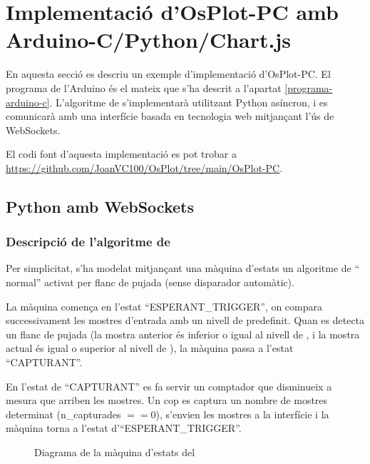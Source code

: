 \documentclass{tfgitic}[2023/07/07]
\begin{document}
\chapter{Implementació d'OsPlot-PC amb Arduino-C/Python/Chart.js}

En aquesta secció es descriu un exemple d'implementació
d'OsPlot-PC. El programa de l'Arduino és el mateix que s'ha descrit a
l'apartat \ref{programa-arduino-c}. L'algoritme de 
s'implementarà utilitzant Python asíncron, i es comunicarà amb una
interfície basada en tecnologia web mitjançant l'ús de WebSockets.

El codi font d'aquesta implementació es pot trobar a
\url{https://github.com/JoanVC100/OsPlot/tree/main/OsPlot-PC}.

\section{ Python amb WebSockets}

\subsection{Descripció de l'algoritme de }
\label{subsec:maquina-trigger}

Per simplicitat, s'ha modelat mitjançant una màquina d'estats un
algoritme de `` normal'' activat per flanc de pujada
(sense disparador automàtic).

La màquina comença en l'estat ``ESPERANT\_TRIGGER'', on compara
successivament les mostres d'entrada amb un nivell de 
predefinit. Quan es detecta un flanc de pujada (la mostra anterior és
inferior o igual al nivell de , i la mostra actual és
igual o superior al nivell de ), la màquina passa a
l'estat ``CAPTURANT''.

En l'estat de ``CAPTURANT'' es fa servir un comptador que disminueix a
mesura que arriben les mostres. Un cop es captura un nombre de mostres
determinat (n\_capturades $== 0$), s'envien les mostres a la
interfície i la màquina torna a l'estat d'``ESPERANT\_TRIGGER''.

\begin{figure}[!hb]
      \centering
      \caption{Diagrama de la màquina d'estats del }
\end{figure}
\end{document}
